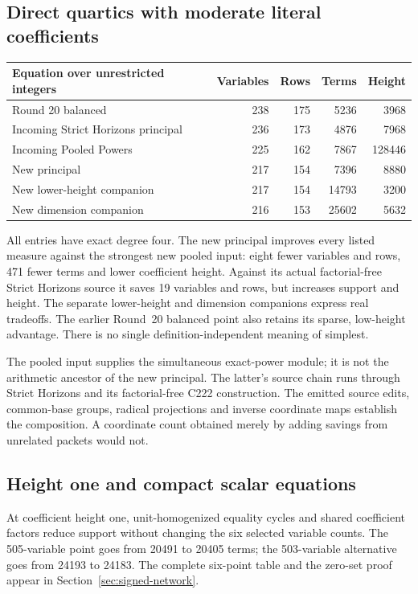 \subsection{Direct quartics with moderate literal coefficients}
\begin{center}\small
\begin{tabular}{@{}lrrrr@{}}\toprule
Equation over unrestricted integers & Variables & Rows & Terms & Height\\\midrule
Round 20 balanced &238&175&5236&3968\\
Incoming Strict Horizons principal &236&173&4876&7968\\
Incoming Pooled Powers &225&162&7867&128446\\\midrule
New principal &217&154&7396&8880\\
New lower-height companion &217&154&14793&3200\\
New dimension companion &216&153&25602&5632\\\bottomrule
\end{tabular}
\end{center}
All entries have exact degree four. The new principal improves every
listed measure against the strongest new pooled input: eight fewer
variables and rows, 471 fewer terms and lower coefficient height.
Against its actual factorial-free Strict Horizons source it saves
19 variables and rows, but increases support and height. The separate
lower-height and dimension companions express real tradeoffs.
The earlier Round~20 balanced point also retains its sparse, low-height
advantage. There is no single definition-independent meaning of simplest.

The pooled input supplies the simultaneous exact-power module; it is not
the arithmetic ancestor of the new principal. The latter's source chain
runs through Strict Horizons and its factorial-free C222 construction.
The emitted source edits, common-base groups, radical projections and
inverse coordinate maps establish the composition. A coordinate count
obtained merely by adding savings from unrelated packets would not.

\subsection{Height one and compact scalar equations}
At coefficient height one, unit-homogenized equality cycles and shared
coefficient factors reduce support without changing the six selected
variable counts. The 505-variable point goes from 20491 to 20405 terms;
the 503-variable alternative goes from 24193 to 24183. The complete
six-point table and the zero-set proof appear in Section~\ref{sec:signed-network}.

